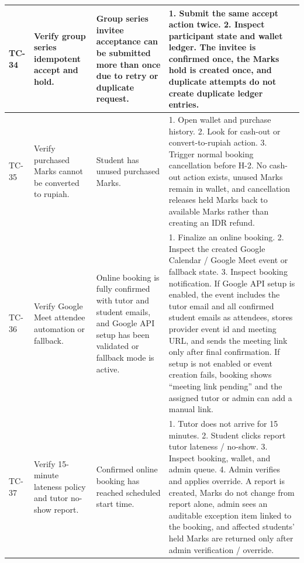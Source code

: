 \documentclass[11pt,a4paper]{article}
\begin{document}
\begin{longtable}{|L{1.2cm}|L{3.3cm}|L{3.9cm}|L{6.0cm}|}
	\hline
	TC-34          & Verify group series idempotent accept and hold.              & Group series invitee acceptance can be submitted more than once due to retry or duplicate request.                                & 1. Submit the same accept action twice. 2. Inspect participant state and wallet ledger. \newline The invitee is confirmed once, the Marks hold is created once, and duplicate attempts do not create duplicate ledger entries.                                                      \\
	\hline
	TC-35          & Verify purchased Marks cannot be converted to rupiah.              & Student has unused purchased Marks.                                & 1. Open wallet and purchase history. 2. Look for cash-out or convert-to-rupiah action. 3. Trigger normal booking cancellation before H-2. \newline No cash-out action exists, unused Marks remain in wallet, and cancellation releases held Marks back to available Marks rather than creating an IDR refund.                                                      \\
	\hline
	TC-36          & Verify Google Meet attendee automation or fallback.              & Online booking is fully confirmed with tutor and student emails, and Google API setup has been validated or fallback mode is active.                                & 1. Finalize an online booking. 2. Inspect the created Google Calendar / Google Meet event or fallback state. 3. Inspect booking notification. \newline If Google API setup is enabled, the event includes the tutor email and all confirmed student emails as attendees, stores provider event id and meeting URL, and sends the meeting link only after final confirmation. If setup is not enabled or event creation fails, booking shows ``meeting link pending'' and the assigned tutor or admin can add a manual link.                                                      \\
	\hline
	TC-37          & Verify 15-minute lateness policy and tutor no-show report.              & Confirmed online booking has reached scheduled start time.                                & 1. Tutor does not arrive for 15 minutes. 2. Student clicks report tutor lateness / no-show. 3. Inspect booking, wallet, and admin queue. 4. Admin verifies and applies override. \newline A report is created, Marks do not change from report alone, admin sees an auditable exception item linked to the booking, and affected students' held Marks are returned only after admin verification / override.                                                      \\

\end{longtable}
\end{document}

